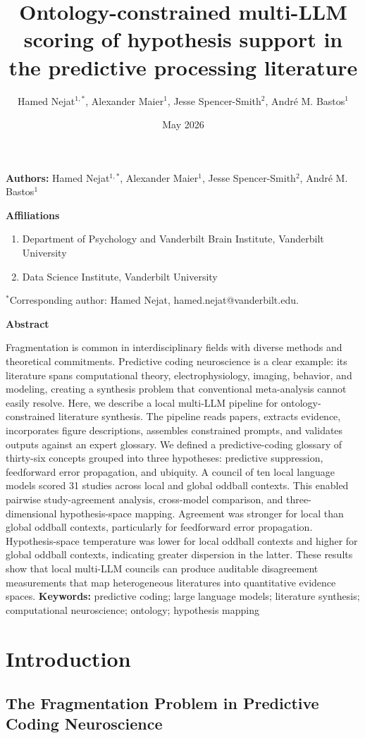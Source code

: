 \documentclass[12pt]{article}
\title{Ontology-constrained multi-LLM scoring of hypothesis support in the predictive processing literature}
\author{Hamed Nejat$^{1,*}$, Alexander Maier$^{1}$, Jesse Spencer-Smith$^{2}$, Andr\'e M. Bastos$^{1}$}
\date{May 2026}
\makeatletter
\renewcommand{\maketitle}{%
  \begin{flushleft}
  {\large\bfseries \@title\par}
  \vspace{0.9em}
  {\normalsize\textbf{Authors:} Hamed Nejat$^{1,*}$, Alexander Maier$^{1}$, Jesse Spencer-Smith$^{2}$, Andr\'e M. Bastos$^{1}$\par}
  \vspace{0.9em}
  {\normalsize\bfseries Affiliations\par}
  \vspace{0.5em}
  \begin{enumerate}[leftmargin=0.75in,label=\arabic*.]
  \item Department of Psychology and Vanderbilt Brain Institute, Vanderbilt University
  \item Data Science Institute, Vanderbilt University
  \end{enumerate}
  \vspace{0.3em}
  {\normalsize $^*$Corresponding author: Hamed Nejat, hamed.nejat@vanderbilt.edu.\par}
  \end{flushleft}
  \vspace{0.4em}
}
\makeatother
\begin{document}
\pagestyle{plain}
\maketitle
\linenumbers

\noindent\textbf{Abstract}\par
Fragmentation is common in interdisciplinary fields with diverse methods and theoretical commitments. Predictive coding neuroscience is a clear example: its literature spans computational theory, electrophysiology, imaging, behavior, and modeling, creating a synthesis problem that conventional meta-analysis cannot easily resolve. Here, we describe a local multi-LLM pipeline for ontology-constrained literature synthesis. The pipeline reads papers, extracts evidence, incorporates figure descriptions, assembles constrained prompts, and validates outputs against an expert glossary. We defined a predictive-coding glossary of thirty-six concepts grouped into three hypotheses: predictive suppression, feedforward error propagation, and ubiquity. A council of ten local language models scored 31 studies across local and global oddball contexts. This enabled pairwise study-agreement analysis, cross-model comparison, and three-dimensional hypothesis-space mapping. Agreement was stronger for local than global oddball contexts, particularly for feedforward error propagation. Hypothesis-space temperature was lower for local oddball contexts and higher for global oddball contexts, indicating greater dispersion in the latter. These results show that local multi-LLM councils can produce auditable disagreement measurements that map heterogeneous literatures into quantitative evidence spaces.
\vspace{0.8em}
\noindent\textbf{Keywords:} predictive coding; large language models; literature synthesis; computational neuroscience; ontology; hypothesis mapping

\section{Introduction}\label{introduction}

\subsection{The Fragmentation Problem in Predictive Coding Neuroscience}\label{the-fragmentation-problem-in-predictive-coding-neuroscience}
\end{document}
